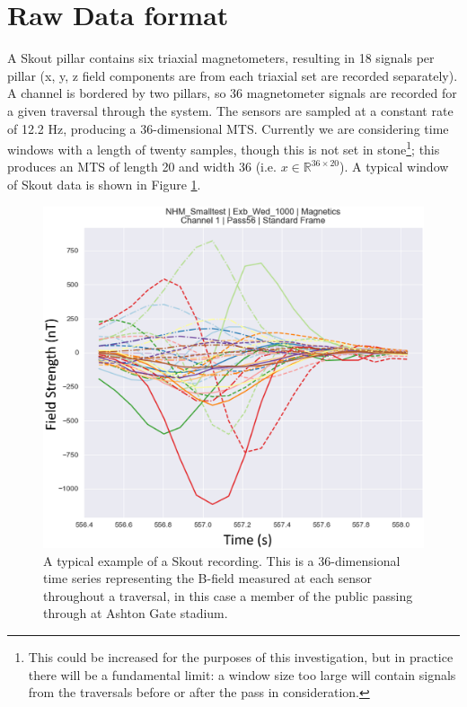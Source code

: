\documentclass[10pt, a4paper, twocolumn]{article} %
\begin{document}

\section{Raw Data format}

A Skout pillar contains six triaxial magnetometers, resulting in 18 signals per pillar (x, y, z field components are from each triaxial set are recorded separately). A channel is bordered by two pillars, so 36 magnetometer signals are recorded for a given traversal through the system. The sensors are sampled at a constant rate of 12.2 Hz, producing a 36-dimensional MTS. Currently we are considering time windows with a length of twenty samples, though this is not set in stone\footnote{This could be increased for the purposes of this investigation, but in practice there will be a fundamental limit: a window size too large will contain signals from the traversals before or after the pass in consideration.}; this produces an MTS of length 20 and width 36 (i.e. $x \in \mathbb{R}^{36\times20}$). A typical window of Skout data is shown in Figure \ref{Skout_ref_data}.

\begin{figure}
	\includegraphics[width=\linewidth]{Figures/example_data.png} %
	\caption{A typical example of a Skout recording. This is a 36-dimensional time series representing the B-field measured at each sensor throughout a traversal, in this case a member of the public passing through at Ashton Gate stadium.}
	\label{Skout_ref_data}
\end{figure}
\end{document}
